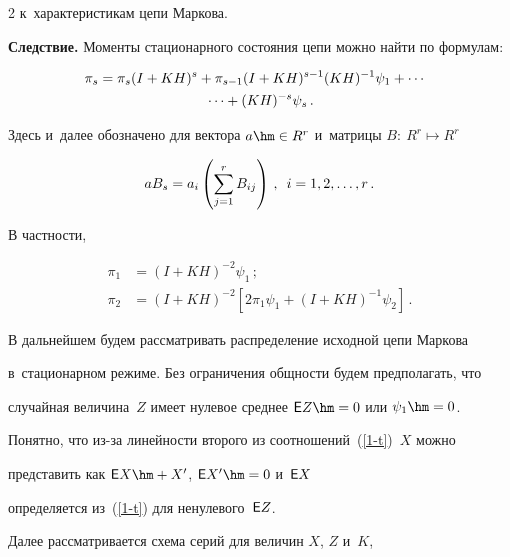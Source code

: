 \begin{multicols}{2}
к~характеристикам цепи Маркова.



\smallskip



\noindent

\textbf{Следствие.}  Моменты стационарного состояния цепи можно найти по формулам:

\begin{multline*}

\hspace*{-6pt}\pi_s=\pi_s(I+KH)^s+ \pi_{s-1}(I+KH)^{s-1} (KH)^{-1}\psi_1+\cdots {}\\

{}\cdots +(KH)^{-s}\psi_s\,.


\end{multline*}

Здесь и~далее обозначено для вектора $a\hm\in R^r$ и~мат\-ри\-цы $B:\ R^r \mapsto R^r$

$$

aB_s=a_i\left(\sum_{j=1}^r B_{ij}\right)\,,\enskip i=1,2,\ldots,r\,.

$$

В частности,



\noindent

\begin{align*}

\pi_1&=(I+KH)^{-2}\psi_1\,;\\

\pi_2&=(I+KH)^{-2}[2\pi_1\psi_1+(I+KH)^{-1}\psi_2]\,.

\end{align*}



В дальнейшем будем рассматривать распределение исходной цепи Маркова

в~стационарном режиме. Без ограничения общности будем предполагать, что

случайная величина~$Z$ имеет нулевое среднее ${\sf E}Z\hm=0$ или $\psi_1\hm=0$.

Понятно, что из-за линейности второго из соотношений~(\ref{1-t})~$X$ можно

представить как ${\sf E}X\hm+X'$, ${\sf E}X'\hm=0$ и~${\sf E}X$

определяется из~(\ref{1-t}) для ненулевого~${\sf E}Z$.



Далее рассматривается схема серий для величин $X$, $Z$ и~$K$,


\end{multicols}
